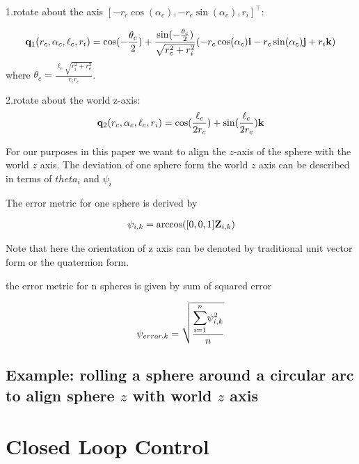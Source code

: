 \documentclass[letter paper, 10pt, conference]{ieeeconf}
\newcommand{\todo}[1]{\vspace{5 mm}\par \noindent \framebox{\begin{minipage}[c]{0.98 \columnwidth} \ttfamily\flushleft \textcolor{red}{#1}\end{minipage}}\vspace{5 mm}\par}
\begin{document}
1.rotate about the axis $[ -r_c \cos(\alpha_c), -r_c\sin(\alpha_c),r_i]^\top$:

\begin{align}
{\bf q}_1(r_c, \alpha_c, \ell_c, r_i)   = \cos( -\frac{\theta_c}{2})+ \frac{\sin({-\frac{\theta_c}{2}})}{\sqrt{r_c^2+r_i^2}}(-r_c\cos(\alpha_c){\bf i}-r_c\sin(\alpha_c){\bf j}+r_i{\bf k}) \label{eq:RotatingAboutACircleArc1}
\end{align}
where $\theta_c=\frac{\ell_c\sqrt{r_i^2+r_c^2}}{r_ir_c}$.

2.rotate about the world z-axis:
\begin{align}
{\bf q}_2(r_c, \alpha_c, \ell_c, r_i)=\cos(\frac{\ell_c}{2r_c})+\sin(\frac{\ell_c}{2r_c}){\bf k}\label{eq:RotatingAboutACircleArc2}
\end{align}

For our purposes in this paper we want to align the $z$-axis of the sphere with the world $z$ axis.  The deviation of one sphere form the world  $z$ axis can be described in terms of $theta_i$ and $\psi_i$  


 The error metric for one sphere is derived by
 
\begin{align}
\psi_{i,k} = \arccos([0,0,1]{\bf Z}_{i,k}) \label{eq:errorForOneSphere}
\end{align}

Note that here the orientation of z axis can be denoted by traditional unit vector form or the quaternion form.

 the error metric for n spheres is given by sum of squared error
 
\begin{align}
\psi_{error,k} = \sqrt{\frac{\mathlarger{\sum}_{i=1}^{n}\psi_{i,k}^2}{n}} \label{eq:errorForManySpheres}
\end{align}



\subsection{Example: rolling a sphere around a circular arc to align sphere $z$ with world $z$ axis}

\todo{solve this problem}




\section{Closed Loop Control}\label{sec:ClosedLoopControl}%
\end{document}
